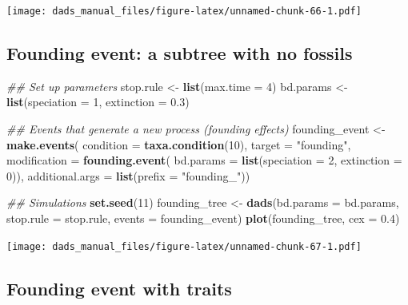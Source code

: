 \documentclass[]{book}
\newenvironment{Shaded}{\begin{snugshade}}{\end{snugshade}}
\newcommand{\CommentTok}[1]{\textcolor[rgb]{0.56,0.35,0.01}{\textit{#1}}}
\newcommand{\DataTypeTok}[1]{\textcolor[rgb]{0.13,0.29,0.53}{#1}}
\newcommand{\DecValTok}[1]{\textcolor[rgb]{0.00,0.00,0.81}{#1}}
\newcommand{\FloatTok}[1]{\textcolor[rgb]{0.00,0.00,0.81}{#1}}
\newcommand{\KeywordTok}[1]{\textcolor[rgb]{0.13,0.29,0.53}{\textbf{#1}}}
\newcommand{\NormalTok}[1]{#1}
\newcommand{\StringTok}[1]{\textcolor[rgb]{0.31,0.60,0.02}{#1}}
\begin{document}
\texttt{[image: dads\_manual\_files/figure-latex/unnamed-chunk-66-1.pdf]}

\hypertarget{founding-event-a-subtree-with-no-fossils}{%
\subsection{Founding event: a subtree with no fossils}\label{founding-event-a-subtree-with-no-fossils}}

\begin{Shaded}
\begin{Highlighting}[]
\CommentTok{## Set up parameters}
\NormalTok{stop.rule <-}\StringTok{ }\KeywordTok{list}\NormalTok{(}\DataTypeTok{max.time =} \DecValTok{4}\NormalTok{)}
\NormalTok{bd.params <-}\StringTok{ }\KeywordTok{list}\NormalTok{(}\DataTypeTok{speciation =} \DecValTok{1}\NormalTok{, }\DataTypeTok{extinction =} \FloatTok{0.3}\NormalTok{)}

\CommentTok{## Events that generate a new process (founding effects)}
\NormalTok{founding_event <-}\StringTok{ }\KeywordTok{make.events}\NormalTok{(}
                  \DataTypeTok{condition    =} \KeywordTok{taxa.condition}\NormalTok{(}\DecValTok{10}\NormalTok{),}
                  \DataTypeTok{target       =} \StringTok{"founding"}\NormalTok{,}
                  \DataTypeTok{modification =} \KeywordTok{founding.event}\NormalTok{(}
                                    \DataTypeTok{bd.params =} \KeywordTok{list}\NormalTok{(}\DataTypeTok{speciation =} \DecValTok{2}\NormalTok{,}
                                                     \DataTypeTok{extinction =} \DecValTok{0}\NormalTok{)),}
                  \DataTypeTok{additional.args =} \KeywordTok{list}\NormalTok{(}\DataTypeTok{prefix =} \StringTok{"founding_"}\NormalTok{))}
    
\CommentTok{## Simulations}
\KeywordTok{set.seed}\NormalTok{(}\DecValTok{11}\NormalTok{)}
\NormalTok{founding_tree <-}\StringTok{ }\KeywordTok{dads}\NormalTok{(}\DataTypeTok{bd.params =}\NormalTok{ bd.params,}
                      \DataTypeTok{stop.rule =}\NormalTok{ stop.rule,}
                      \DataTypeTok{events    =}\NormalTok{ founding_event)}
\KeywordTok{plot}\NormalTok{(founding_tree, }\DataTypeTok{cex =} \FloatTok{0.4}\NormalTok{)}
\end{Highlighting}
\end{Shaded}

\texttt{[image: dads\_manual\_files/figure-latex/unnamed-chunk-67-1.pdf]}

\hypertarget{founding-event-with-traits}{%
\subsection{Founding event with traits}\label{founding-event-with-traits}}
\end{document}
